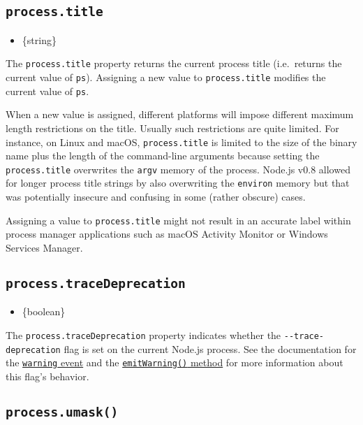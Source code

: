 \subsection{\texorpdfstring{\texttt{process.title}}{process.title}}\label{process.title}

\begin{itemize}
\tightlist
\item
  \{string\}
\end{itemize}

The \texttt{process.title} property returns the current process title
(i.e.~returns the current value of \texttt{ps}). Assigning a new value
to \texttt{process.title} modifies the current value of \texttt{ps}.

When a new value is assigned, different platforms will impose different
maximum length restrictions on the title. Usually such restrictions are
quite limited. For instance, on Linux and macOS, \texttt{process.title}
is limited to the size of the binary name plus the length of the
command-line arguments because setting the \texttt{process.title}
overwrites the \texttt{argv} memory of the process. Node.js v0.8 allowed
for longer process title strings by also overwriting the
\texttt{environ} memory but that was potentially insecure and confusing
in some (rather obscure) cases.

Assigning a value to \texttt{process.title} might not result in an
accurate label within process manager applications such as macOS
Activity Monitor or Windows Services Manager.

\subsection{\texorpdfstring{\texttt{process.traceDeprecation}}{process.traceDeprecation}}\label{process.tracedeprecation}

\begin{itemize}
\tightlist
\item
  \{boolean\}
\end{itemize}

The \texttt{process.traceDeprecation} property indicates whether the
\texttt{-\/-trace-deprecation} flag is set on the current Node.js
process. See the documentation for the
\hyperref[event-warning]{\texttt{\textquotesingle{}warning\textquotesingle{}}
event} and the
\hyperref[processemitwarningwarning-type-code-ctor]{\texttt{emitWarning()}
method} for more information about this flag's behavior.

\subsection{\texorpdfstring{\texttt{process.umask()}}{process.umask()}}\label{process.umask}

